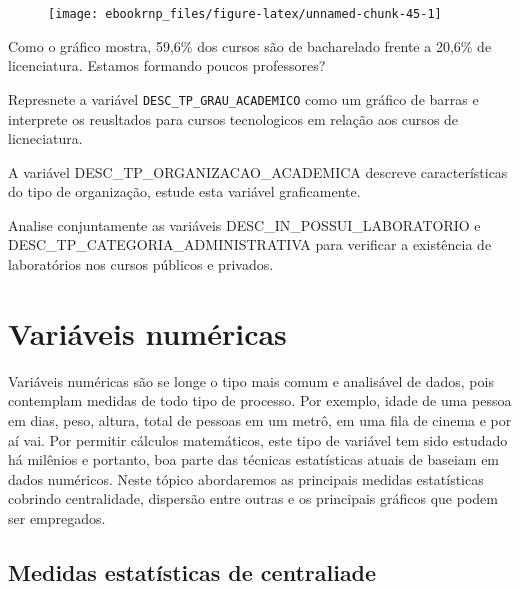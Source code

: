 \documentclass[12pt,]{style/krantz}
\theoremstyle{definition}
\theoremstyle{definition}
\theoremstyle{definition}
\theoremstyle{remark}
\let\BeginKnitrBlock\begin \let\EndKnitrBlock\end
\begin{document}
\begin{figure}[H]

{\centering \texttt{[image: ebookrnp\_files/figure-latex/unnamed-chunk-45-1]} 

}

\end{figure}

Como o gráfico mostra, 59,6\% dos cursos são de bacharelado frente a
20,6\% de licenciatura. Estamos formando poucos professores?

\BeginKnitrBlock{exercise}
\protect\hypertarget{exr:unnamed-chunk-46}{}{\label{exr:unnamed-chunk-46}
}Represnete a variável \texttt{DESC\_TP\_GRAU\_ACADEMICO} como um
gráfico de barras e interprete os reusltados para cursos tecnologicos em
relação aos cursos de licneciatura.
\EndKnitrBlock{exercise}

\BeginKnitrBlock{exercise}
\protect\hypertarget{exr:unnamed-chunk-47}{}{\label{exr:unnamed-chunk-47} }A
variável DESC\_TP\_ORGANIZACAO\_ACADEMICA descreve características do
tipo de organização, estude esta variável graficamente.
\EndKnitrBlock{exercise}

\BeginKnitrBlock{exercise}
\protect\hypertarget{exr:unnamed-chunk-48}{}{\label{exr:unnamed-chunk-48}
}Analise conjuntamente as variáveis DESC\_IN\_POSSUI\_LABORATORIO e
DESC\_TP\_CATEGORIA\_ADMINISTRATIVA para verificar a existência de
laboratórios nos cursos públicos e privados.
\EndKnitrBlock{exercise}

\section{Variáveis numéricas}\label{variaveis-numericas}

Variáveis numéricas são se longe o tipo mais comum e analisável de
dados, pois contemplam medidas de todo tipo de processo. Por exemplo,
idade de uma pessoa em dias, peso, altura, total de pessoas em um metrô,
em uma fila de cinema e por aí vai. Por permitir cálculos matemáticos,
este tipo de variável tem sido estudado há milênios e portanto, boa
parte das técnicas estatísticas atuais de baseiam em dados numéricos.
Neste tópico abordaremos as principais medidas estatísticas cobrindo
centralidade, dispersão entre outras e os principais gráficos que podem
ser empregados.

\subsection{Medidas estatísticas de
centraliade}\label{medidas-estatisticas-de-centraliade}
\end{document}
